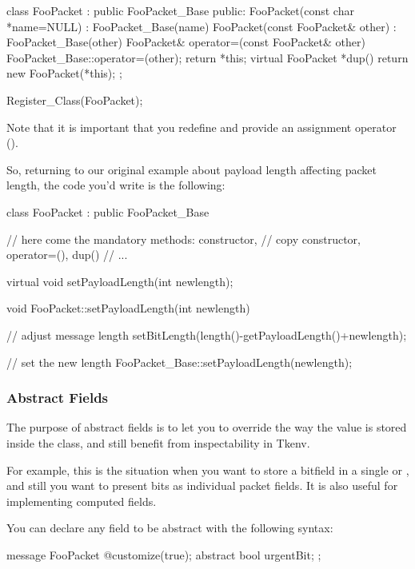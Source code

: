 \begin{cpp}
class FooPacket : public FooPacket_Base
{
  public:
    FooPacket(const char *name=NULL) : FooPacket_Base(name) {}
    FooPacket(const FooPacket& other) : FooPacket_Base(other) {}
    FooPacket& operator=(const FooPacket& other)
        {FooPacket_Base::operator=(other); return *this;}
    virtual FooPacket *dup() {return new FooPacket(*this);}
};

Register_Class(FooPacket);
\end{cpp}

Note that it is important that you redefine  and
provide an assignment operator ().

So, returning to our original example about payload length
affecting packet length, the code you'd write is the following:

\begin{cpp}
class FooPacket : public FooPacket_Base
{
    // here come the mandatory methods: constructor,
    // copy constructor, operator=(), dup()
    // ...

    virtual void setPayloadLength(int newlength);
}

void FooPacket::setPayloadLength(int newlength)
{
    // adjust message length
    setBitLength(length()-getPayloadLength()+newlength);

    // set the new length
    FooPacket_Base::setPayloadLength(newlength);
}
\end{cpp}



\subsubsection{Abstract Fields}

The purpose of abstract fields is to let you to override
the way the value is stored inside the class,
and still benefit from inspectability in Tkenv.

For example, this is the situation when you want to store a bitfield
in a single  or , and still you want
to present bits as individual packet fields.
It is also useful for implementing computed fields.

You can declare any field to be abstract with the following syntax:

\begin{msg}
message FooPacket
{
   @customize(true);
   abstract bool urgentBit;
};
\end{msg}

